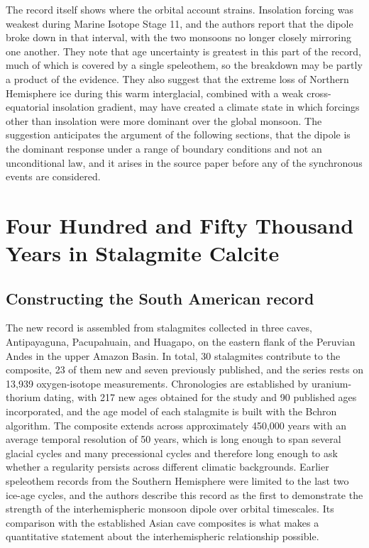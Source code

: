 \documentclass[11pt]{article}
\theoremstyle{definition}
\begin{document}
The record itself shows where the orbital account strains. Insolation forcing was weakest during Marine Isotope Stage 11, and the authors report that the dipole broke down in that interval, with the two monsoons no longer closely mirroring one another. They note that age uncertainty is greatest in this part of the record, much of which is covered by a single speleothem, so the breakdown may be partly a product of the evidence. They also suggest that the extreme loss of Northern Hemisphere ice during this warm interglacial, combined with a weak cross-equatorial insolation gradient, may have created a climate state in which forcings other than insolation were more dominant over the global monsoon. The suggestion anticipates the argument of the following sections, that the dipole is the dominant response under a range of boundary conditions and not an unconditional law, and it arises in the source paper before any of the synchronous events are considered.

\section{Four Hundred and Fifty Thousand Years in Stalagmite Calcite}

\subsection{Constructing the South American record}

The new record is assembled from stalagmites collected in three caves, Antipayaguna, Pacupahuain, and Huagapo, on the eastern flank of the Peruvian Andes in the upper Amazon Basin. In total, 30 stalagmites contribute to the composite, 23 of them new and seven previously published, and the series rests on 13,939 oxygen-isotope measurements. Chronologies are established by uranium-thorium dating, with 217 new ages obtained for the study and 90 published ages incorporated, and the age model of each stalagmite is built with the Bchron algorithm. The composite extends across approximately 450,000 years with an average temporal resolution of 50 years, which is long enough to span several glacial cycles and many precessional cycles and therefore long enough to ask whether a regularity persists across different climatic backgrounds. Earlier speleothem records from the Southern Hemisphere were limited to the last two ice-age cycles, and the authors describe this record as the first to demonstrate the strength of the interhemispheric monsoon dipole over orbital timescales. Its comparison with the established Asian cave composites is what makes a quantitative statement about the interhemispheric relationship possible.
\end{document}

